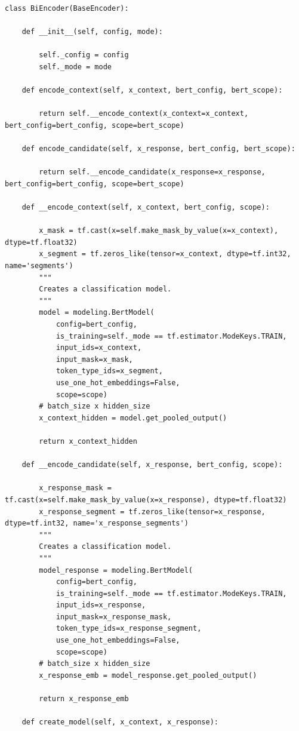 \documentclass[twoside,a4paper,12pt]{book}%
\begin{document}
\begin{lstlisting}
class BiEncoder(BaseEncoder):

    def __init__(self, config, mode):

        self._config = config
        self._mode = mode

    def encode_context(self, x_context, bert_config, bert_scope):

        return self.__encode_context(x_context=x_context, bert_config=bert_config, scope=bert_scope)

    def encode_candidate(self, x_response, bert_config, bert_scope):

        return self.__encode_candidate(x_response=x_response, bert_config=bert_config, scope=bert_scope)

    def __encode_context(self, x_context, bert_config, scope):

        x_mask = tf.cast(x=self.make_mask_by_value(x=x_context), dtype=tf.float32)
        x_segment = tf.zeros_like(tensor=x_context, dtype=tf.int32, name='segments')
        """
        Creates a classification model.
        """
        model = modeling.BertModel(
            config=bert_config,
            is_training=self._mode == tf.estimator.ModeKeys.TRAIN,
            input_ids=x_context,
            input_mask=x_mask,
            token_type_ids=x_segment,
            use_one_hot_embeddings=False,
            scope=scope)
        # batch_size x hidden_size
        x_context_hidden = model.get_pooled_output()

        return x_context_hidden

    def __encode_candidate(self, x_response, bert_config, scope):

        x_response_mask = tf.cast(x=self.make_mask_by_value(x=x_response), dtype=tf.float32)
        x_response_segment = tf.zeros_like(tensor=x_response, dtype=tf.int32, name='x_response_segments')
        """
        Creates a classification model.
        """
        model_response = modeling.BertModel(
            config=bert_config,
            is_training=self._mode == tf.estimator.ModeKeys.TRAIN,
            input_ids=x_response,
            input_mask=x_response_mask,
            token_type_ids=x_response_segment,
            use_one_hot_embeddings=False,
            scope=scope)
        # batch_size x hidden_size
        x_response_emb = model_response.get_pooled_output()

        return x_response_emb

    def create_model(self, x_context, x_response):


\end{lstlisting}
\end{document}
